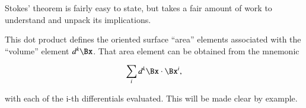 %
%
Stokes' theorem is fairly easy to state, but takes a fair amount of work to understand and unpack its implications.



This dot product defines the oriented surface ``area'' elements associated with the ``volume'' element \( d^k \Bx \).
That area element can be obtained from the mnemonic

\begin{dmath}\label{eqn:stokesTheoremCore:1561}
\sum_i d^k \Bx \cdot \Bx^i,
\end{dmath}

with each of the i-th differentials evaluated.
This will be made clear by example.

